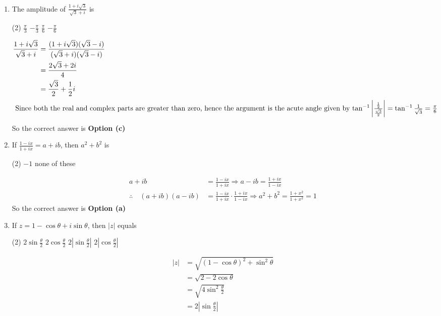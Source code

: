 \begin{enumerate}
	\item The amplitude of $\frac{1+i \sqrt{3}}{\sqrt{3}+i}$ is
	\begin{tasks}(2)
		\task[\textbf{a.}]$\frac{\pi}{3}$
		\task[\textbf{b.}]$-\frac{\pi}{3}$
		\task[\textbf{c.}]$\frac{\pi}{6}$
		\task[\textbf{d.}]  $-\frac{\pi}{6}$
	\end{tasks}
	\begin{answer}
	\begin{align*}
	\frac{1+i \sqrt{3}}{\sqrt{3}+i}&=\frac{(1+i \sqrt{3})(\sqrt{3}-i)}{(\sqrt{3}+i)(\sqrt{3}-i)}\\&=\frac{2 \sqrt{3}+2 i}{4}\\&=\frac{\sqrt{3}}{2}+\frac{1}{2} i\\
	\intertext{	Since both the real and complex parts are greater than zero, hence the argument is the acute angle given by $\tan ^{-1}\left|\frac{\frac{1}{2}}{\frac{\sqrt{3}}{2}}\right|=\tan ^{-1} \frac{1}{\sqrt{3}}=\frac{\pi}{6}$}
	\end{align*}
	So the correct answer is \textbf{Option (c)}
\end{answer}	
	\item If $\frac{1-i x}{1+i x}=a+i b$, then $a^{2}+b^{2}$ is
	\begin{tasks}(2)
		\task[\textbf{b.}]$-1$
		\task[\textbf{d.}] none of these
	\end{tasks}
	\begin{answer}
	\begin{align*}
	a+i b&=\frac{1-i x}{1+i x} \Rightarrow a-i b=\frac{1+i x}{1-i x}\\
	\therefore \quad(a+i b)(a-i b)&=\frac{1-i x}{1+i x} \cdot \frac{1+i x}{1-i x} \Rightarrow a^{2}+b^{2}=\frac{1+x^{2}}{1+x^{2}}=1
	\end{align*}
	So the correct answer is \textbf{Option (a)}
\end{answer}
	\item If $z=1-\cos \theta+i \sin \theta$, then $|z|$ equals
	\begin{tasks}(2)
		\task[\textbf{a.}]$2 \sin \frac{\theta}{2}$
		\task[\textbf{b.}]$2 \cos \frac{\theta}{2}$
		\task[\textbf{c.}]$2\left|\sin \frac{\theta}{2}\right|$
		\task[\textbf{d.}] $2\left|\cos \frac{\theta}{2}\right|$
	\end{tasks}
\begin{answer}
	\begin{align*}
	|z|&=\sqrt{(1-\cos \theta)^{2}+\sin ^{2} \theta}\\&=\sqrt{2-2 \cos \theta}\\&=\sqrt{4 \sin ^{2} \frac{\theta}{2}}\\&=2\left|\sin \frac{\theta}{2}\right|

\end{align*}
\end{answer}
\end{enumerate}
